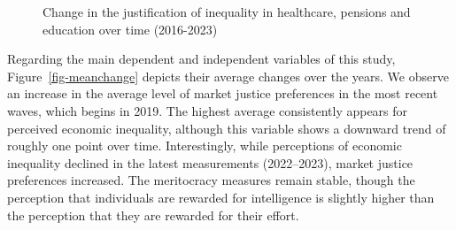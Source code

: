 \documentclass[
  12pt,
]{article}
\begin{document}
\begin{figure}[H]

\caption{\label{fig-alluvial}Change in the justification of inequality
in healthcare, pensions and education over time (2016-2023)}


\end{figure}%

Regarding the main dependent and independent variables of this study,
Figure~\ref{fig-meanchange} depicts their average changes over the
years. We observe an increase in the average level of market justice
preferences in the most recent waves, which begins in 2019. The highest
average consistently appears for perceived economic inequality, although
this variable shows a downward trend of roughly one point over time.
Interestingly, while perceptions of economic inequality declined in the
latest measurements (2022--2023), market justice preferences increased.
The meritocracy measures remain stable, though the perception that
individuals are rewarded for intelligence is slightly higher than the
perception that they are rewarded for their effort.
\end{document}
